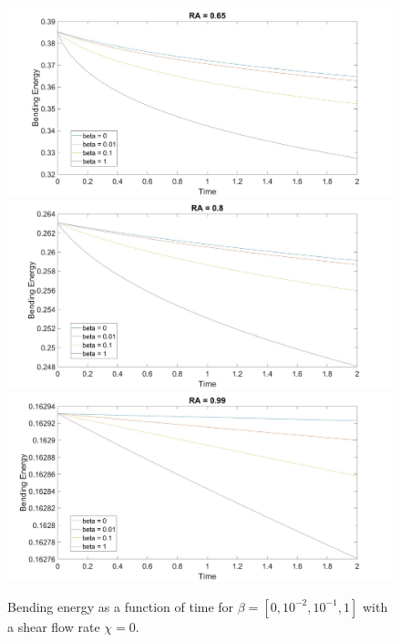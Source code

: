 \documentclass[aps,prl,showpacs]{revtex4}
\begin{document}
 
 \begin{figure}
 	\centering
 	\includegraphics[width=.9\textwidth]{figures/BE1.jpg}
 	\includegraphics[width=.9\textwidth]{figures/BE2.jpg}
 	\includegraphics[width=.9\textwidth]{figures/BE3.jpg}
 	\caption{Bending energy as a function of time for $\beta = [0, 10^{-2},10^{-1}, 1]$ with a shear flow rate $\chi = 0$.}
 \end{figure}
 
\end{document}
